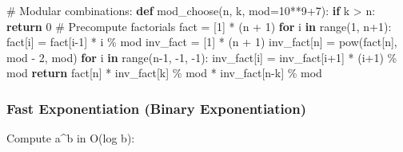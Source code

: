 \documentclass[11pt]{article}
\newenvironment{Shaded}{\begin{snugshade}}{\end{snugshade}}
\newcommand{\BuiltInTok}[1]{\textcolor[rgb]{0.50,0.55,0.55}{#1}}
\newcommand{\CommentTok}[1]{\textcolor[rgb]{0.48,0.49,0.49}{#1}}
\newcommand{\ControlFlowTok}[1]{\textcolor[rgb]{0.99,0.74,0.29}{\textbf{#1}}}
\newcommand{\DecValTok}[1]{\textcolor[rgb]{0.96,0.45,0.00}{#1}}
\newcommand{\KeywordTok}[1]{\textcolor[rgb]{0.81,0.81,0.76}{\textbf{#1}}}
\newcommand{\NormalTok}[1]{\textcolor[rgb]{0.81,0.81,0.76}{#1}}
\newcommand{\OperatorTok}[1]{\textcolor[rgb]{0.81,0.81,0.76}{#1}}
\begin{document}
\begin{Shaded}
\begin{Highlighting}[]
\CommentTok{\# Modular combinations:}
\KeywordTok{def}\NormalTok{ mod\_choose(n, k, mod}\OperatorTok{=}\DecValTok{10}\OperatorTok{**}\DecValTok{9}\OperatorTok{+}\DecValTok{7}\NormalTok{):}
    \ControlFlowTok{if}\NormalTok{ k }\OperatorTok{\textgreater{}}\NormalTok{ n: }\ControlFlowTok{return} \DecValTok{0}
    \CommentTok{\# Precompute factorials}
\NormalTok{    fact }\OperatorTok{=}\NormalTok{ [}\DecValTok{1}\NormalTok{] }\OperatorTok{*}\NormalTok{ (n }\OperatorTok{+} \DecValTok{1}\NormalTok{)}
    \ControlFlowTok{for}\NormalTok{ i }\KeywordTok{in} \BuiltInTok{range}\NormalTok{(}\DecValTok{1}\NormalTok{, n}\OperatorTok{+}\DecValTok{1}\NormalTok{):}
\NormalTok{        fact[i] }\OperatorTok{=}\NormalTok{ fact[i}\OperatorTok{{-}}\DecValTok{1}\NormalTok{] }\OperatorTok{*}\NormalTok{ i }\OperatorTok{\%}\NormalTok{ mod}
\NormalTok{    inv\_fact }\OperatorTok{=}\NormalTok{ [}\DecValTok{1}\NormalTok{] }\OperatorTok{*}\NormalTok{ (n }\OperatorTok{+} \DecValTok{1}\NormalTok{)}
\NormalTok{    inv\_fact[n] }\OperatorTok{=} \BuiltInTok{pow}\NormalTok{(fact[n], mod }\OperatorTok{{-}} \DecValTok{2}\NormalTok{, mod)}
    \ControlFlowTok{for}\NormalTok{ i }\KeywordTok{in} \BuiltInTok{range}\NormalTok{(n}\OperatorTok{{-}}\DecValTok{1}\NormalTok{, }\OperatorTok{{-}}\DecValTok{1}\NormalTok{, }\OperatorTok{{-}}\DecValTok{1}\NormalTok{):}
\NormalTok{        inv\_fact[i] }\OperatorTok{=}\NormalTok{ inv\_fact[i}\OperatorTok{+}\DecValTok{1}\NormalTok{] }\OperatorTok{*}\NormalTok{ (i}\OperatorTok{+}\DecValTok{1}\NormalTok{) }\OperatorTok{\%}\NormalTok{ mod}
    \ControlFlowTok{return}\NormalTok{ fact[n] }\OperatorTok{*}\NormalTok{ inv\_fact[k] }\OperatorTok{\%}\NormalTok{ mod }\OperatorTok{*}\NormalTok{ inv\_fact[n}\OperatorTok{{-}}\NormalTok{k] }\OperatorTok{\%}\NormalTok{ mod}
\end{Highlighting}
\end{Shaded}

\subsubsection{Fast Exponentiation (Binary Exponentiation)}\label{fast-exponentiation-binary-exponentiation}

Compute a\^{}b in O(log b):

\end{document}
